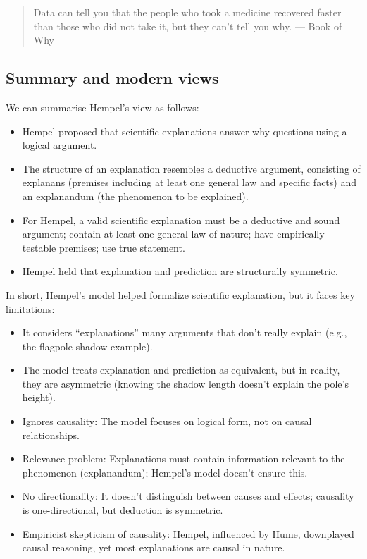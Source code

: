 \documentclass[
  12pt,
]{book}
\providecommand{\tightlist}{%
  \setlength{\itemsep}{0pt}\setlength{\parskip}{0pt}}
\begin{document}
\begin{quote}
Data can tell you that the people who took a medicine recovered faster than those who did not take it, but they can't tell you why. --- Book of Why
\end{quote}

\subsection{Summary and modern views}\label{summary-and-modern-views}

We can summarise Hempel's view as follows:

\begin{itemize}
\tightlist
\item
  Hempel proposed that scientific explanations answer why-questions using a logical argument.
\item
  The structure of an explanation resembles a deductive argument, consisting of explanans (premises including at least one general law and specific facts) and an explanandum (the phenomenon to be explained).
\item
  For Hempel, a valid scientific explanation must be a deductive and sound argument; contain at least one general law of nature; have empirically testable premises; use true statement.
\item
  Hempel held that explanation and prediction are structurally symmetric.
\end{itemize}

In short, Hempel's model helped formalize scientific explanation, but it faces key limitations:

\begin{itemize}
\tightlist
\item
  It considers ``explanations'' many arguments that don't really explain (e.g., the flagpole-shadow example).
\item
  The model treats explanation and prediction as equivalent, but in reality, they are asymmetric (knowing the shadow length doesn't explain the pole's height).
\item
  Ignores causality: The model focuses on logical form, not on causal relationships.
\item
  Relevance problem: Explanations must contain information relevant to the phenomenon (explanandum); Hempel's model doesn't ensure this.
\item
  No directionality: It doesn't distinguish between causes and effects; causality is one-directional, but deduction is symmetric.
\item
  Empiricist skepticism of causality: Hempel, influenced by Hume, downplayed causal reasoning, yet most explanations are causal in nature.
\end{itemize}
\end{document}

